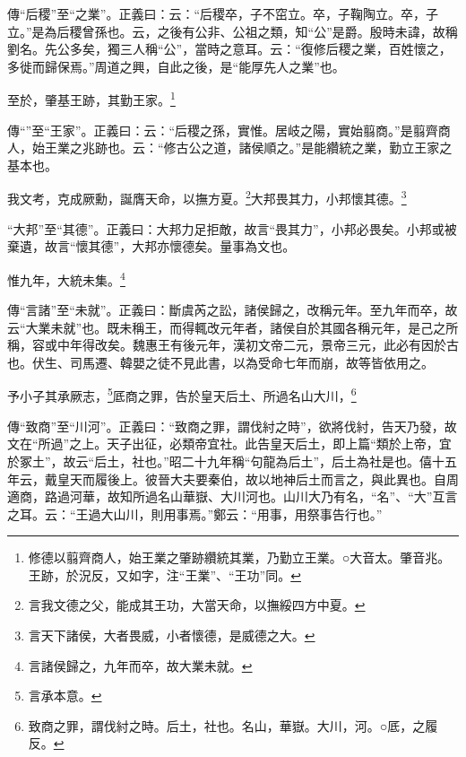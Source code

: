 {\noindent\zhuan{}\fzbyks 傳“后稷”至“之業”。正義曰：云：“后稷卒，子不窋立。卒，子鞠陶立。卒，子立。”是為后稷曾孫也。云，之後有公非、公祖之類，知“公”是爵。殷時未諱，故稱劉名。先公多矣，獨三人稱“公”，當時之意耳。云：“復修后稷之業，百姓懷之，多徙而歸保焉。”周道之興，自此之後，是“能厚先人之業”也。 \par}

至於，肇基王跡，其勤王家。\footnote{修德以翦齊商人，始王業之肇跡纘統其業，乃勤立王業。○大音太。肇音兆。王跡，於況反，又如字，注“王業”、“王功”同。}

{\noindent\shu{}\fzkt 傳“”至“王家”。正義曰：云：“后稷之孫，實惟。居岐之陽，實始翦商。”是翦齊商人，始王業之兆跡也。云：“修古公之道，諸侯順之。”是能纘統之業，勤立王家之基本也。 \par}

我文考，克成厥勳，誕膺天命，以撫方夏。\footnote{言我文德之父，能成其王功，大當天命，以撫綏四方中夏。}大邦畏其力，小邦懷其德。\footnote{言天下諸侯，大者畏威，小者懷德，是威德之大。}

{\noindent\shu{}\fzkt “大邦”至“其德”。正義曰：大邦力足拒敵，故言“畏其力”，小邦必畏矣。小邦或被棄遺，故言“懷其德”，大邦亦懷德矣。量事為文也。 \par}

惟九年，大統未集。\footnote{言諸侯歸之，九年而卒，故大業未就。}

{\noindent\zhuan{}\fzbyks 傳“言諸”至“未就”。正義曰：斷虞芮之訟，諸侯歸之，改稱元年。至九年而卒，故云“大業未就”也。既未稱王，而得輒改元年者，諸侯自於其國各稱元年，是己之所稱，容或中年得改矣。魏惠王有後元年，漢初文帝二元，景帝三元，此必有因於古也。伏生、司馬遷、韓嬰之徒不見此書，以為受命七年而崩，故等皆依用之。 \par}

予小子其承厥志，\footnote{言承本意。}厎商之罪，告於皇天后土、所過名山大川，\footnote{致商之罪，謂伐紂之時。后土，社也。名山，華嶽。大川，河。○厎，之履反。}

{\noindent\zhuan{}\fzbyks 傳“致商”至“川河”。正義曰：“致商之罪，謂伐紂之時”，欲將伐紂，告天乃發，故文在“所過”之上。天子出征，必類帝宜社。此告皇天后土，即上篇“類於上帝，宜於冢土”，故云“后土，社也。”昭二十九年稱“句龍為后土”，后土為社是也。僖十五年云，戴皇天而履後上。彼晉大夫要秦伯，故以地神后土而言之，與此異也。自周適商，路過河華，故知所過名山華嶽、大川河也。山川大乃有名，“名”、“大”互言之耳。云：“王過大山川，則用事焉。”鄭云：“用事，用祭事告行也。” \par}

